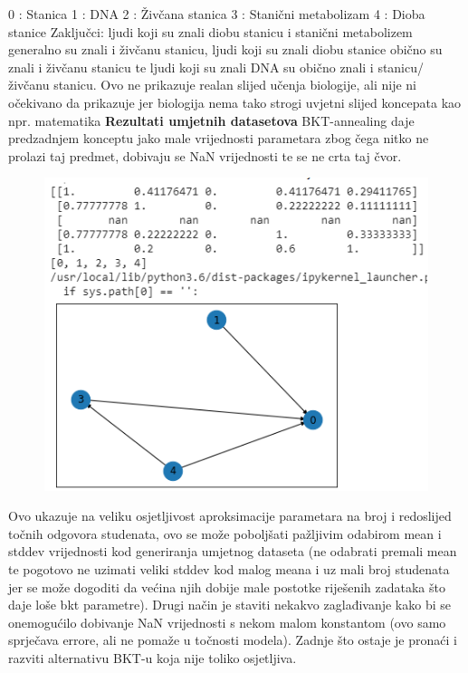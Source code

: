 \documentclass[times, utf8,projekt]{fer}
\begin{document}
		0 : Stanica
		1 : DNA
		2 : Živčana stanica
		3 : Stanični metabolizam
		4 : Dioba stanice\newline
		\newline Zaključci: ljudi koji su znali diobu stanicu i stanični metabolizem generalno su znali i živčanu stanicu, ljudi koji su znali diobu stanice obično su znali i živčanu stanicu te ljudi koji su znali DNA su obično znali i stanicu/živčanu stanicu. Ovo ne prikazuje realan slijed učenja biologije, ali nije ni očekivano da prikazuje jer biologija nema tako strogi uvjetni slijed koncepata kao npr. matematika\newline
		\newline \textbf{Rezultati umjetnih datasetova}	\newline
		BKT-annealing daje predzadnjem konceptu jako male vrijednosti parametara zbog čega nitko ne prolazi taj predmet, dobivaju se NaN vrijednosti te se ne crta taj čvor.
		\begin{figure}[!htb]
			\centering
			\includegraphics[scale=1]{Bayes_graf6.png}
			\caption{}
			\label{}
		\end{figure}
		Ovo ukazuje na veliku osjetljivost aproksimacije parametara na broj i redoslijed točnih odgovora studenata, ovo se može poboljšati pažljivim odabirom mean i stddev vrijednosti kod generiranja umjetnog dataseta (ne odabrati premali mean te pogotovo ne uzimati veliki stddev kod malog meana i uz mali broj studenata jer se može dogoditi da većina njih dobije male postotke riješenih zadataka što daje loše bkt parametre). Drugi način je staviti nekakvo zaglađivanje kako bi se onemogućilo dobivanje NaN vrijednosti s nekom malom konstantom (ovo samo sprječava errore, ali ne pomaže u točnosti modela). Zadnje što ostaje je pronaći i razviti alternativu BKT-u koja nije toliko osjetljiva.
\end{document}

